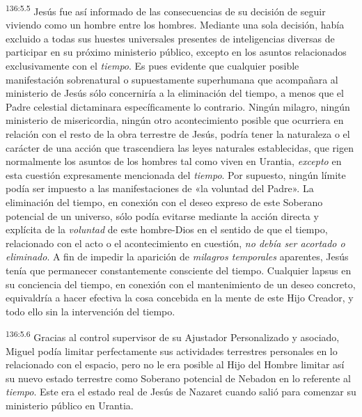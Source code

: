 \par
\textsuperscript{136:5.5} Jesús fue así informado de las consecuencias de su decisión de seguir viviendo como un hombre entre los hombres. Mediante una sola decisión, había excluido a todas sus huestes universales presentes de inteligencias diversas de participar en su próximo ministerio público, excepto en los asuntos relacionados exclusivamente con el \textit{tiempo}. Es pues evidente que cualquier posible manifestación sobrenatural o supuestamente superhumana que acompañara al ministerio de Jesús sólo concerniría a la eliminación del tiempo, a menos que el Padre celestial dictaminara específicamente lo contrario. Ningún milagro, ningún ministerio de misericordia, ningún otro acontecimiento posible que ocurriera en relación con el resto de la obra terrestre de Jesús, podría tener la naturaleza o el carácter de una acción que trascendiera las leyes naturales establecidas, que rigen normalmente los asuntos de los hombres tal como viven en Urantia, \textit{excepto} en esta cuestión expresamente mencionada del \textit{tiempo}. Por supuesto, ningún límite podía ser impuesto a las manifestaciones de «la voluntad del Padre». La eliminación del tiempo, en conexión con el deseo expreso de este Soberano potencial de un universo, sólo podía evitarse mediante la acción directa y explícita de la \textit{voluntad} de este hombre-Dios en el sentido de que el tiempo, relacionado con el acto o el acontecimiento en cuestión, \textit{no debía ser acortado o eliminado}. A fin de impedir la aparición de \textit{milagros temporales} aparentes, Jesús tenía que permanecer constantemente consciente del tiempo. Cualquier lapsus en su conciencia del tiempo, en conexión con el mantenimiento de un deseo concreto, equivaldría a hacer efectiva la cosa concebida en la mente de este Hijo Creador, y todo ello sin la intervención del tiempo.

\par
\textsuperscript{136:5.6} Gracias al control supervisor de su Ajustador Personalizado y asociado, Miguel podía limitar perfectamente sus actividades terrestres personales en lo relacionado con el espacio, pero no le era posible al Hijo del Hombre limitar así su nuevo estado terrestre como Soberano potencial de Nebadon en lo referente al \textit{tiempo}. Este era el estado real de Jesús de Nazaret cuando salió para comenzar su ministerio público en Urantia.


